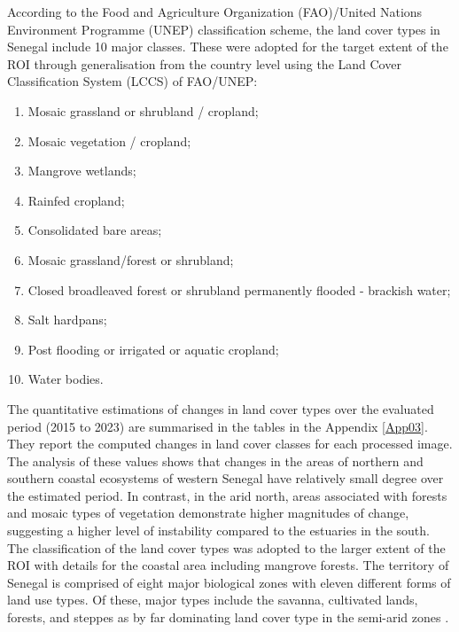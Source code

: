 \documentclass[earth,article,submit,pdftex,moreauthors]{Definitions/mdpi}
\begin{document}
{{ }According to the Food and Agriculture Organization (FAO)/United Nations Environment Programme (UNEP) classification scheme, the land cover types {in Senegal include} 10 major{ }classes{. These{ }were} adopted for the {target extent of the}{ ROI} {through generalisation} from the{ }country level using {the} Land Cover Classification System (LCCS) {of FAO/UNEP}: 

 \begin{enumerate}
        \item Mosaic grassland or shrubland / cropland; 
        \item Mosaic vegetation / cropland; 
        \item Mangrove wetlands; 
        \item Rainfed cropland; 
        \item Consolidated bare areas;
        \item Mosaic grassland/forest or shrubland; 
        \item Closed broadleaved forest or shrubland permanently flooded - brackish water; 
        \item Salt hardpans; 
        \item Post flooding or irrigated or aquatic cropland; 
        \item Water bodies. 
\end{enumerate}

The quantitative estimations of changes in land cover types over the evaluated period (2015 to 2023) are summarised in the tables in the Appendix \ref{App03}{. }They report the computed changes in land cover classes for each processed image. {The analysis of these values shows that changes in the areas of northern and southern coastal ecosystems of western Senegal have relatively small{ degree }over the estimated period. In contrast, in the arid north, areas associated with forests and mosaic types of vegetation demonstrate higher magnitudes of change, suggesting a higher {level of }instability compared to {the }estuaries in the south{.}} {The} classification of the land cover types was adopted to the larger extent of the {ROI} with details for the coastal area {including} mangrove forests. {The} territory of Senegal{ }is comprised of eight major biological zones with eleven different forms of land use types. Of these, major{ }types{ }include the {savanna}, cultivated lands, forests, and steppes{ }as by far dominating land cover type {in the semi-arid zones }\cite{WOOMER2004625}. 

}
\end{document}
